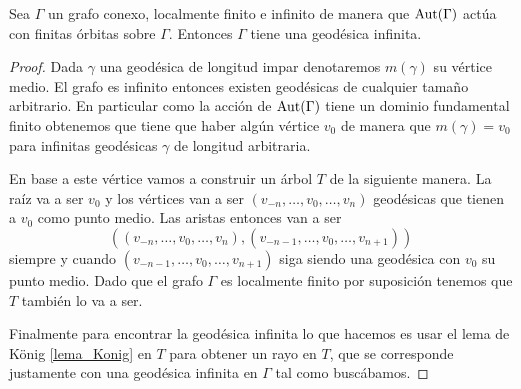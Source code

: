 \documentclass[tesis.tex]{subfiles}
\begin{document}
\begin{lema}\label{lema_geodesica_biinfinita}
	Sea $\Gamma$ un grafo conexo, localmente finito e infinito de manera que $\text{Aut}(\Gamma)$ actúa con finitas órbitas sobre $\Gamma$.
	Entonces $\Gamma$ tiene una geodésica infinita.
\end{lema}
\begin{proof}
	Dada $\gamma$ una geodésica de longitud impar denotaremos $m(\gamma)$ su vértice medio.	
	El grafo es infinito entonces existen geodésicas de cualquier tamaño arbitrario.
	En particular como la acción de $\text{Aut}(\Gamma)$ tiene un dominio fundamental finito obtenemos que tiene que haber algún vértice $v_0$ de manera que $m(\gamma) = v_0$ para infinitas geodésicas $\gamma$ de longitud arbitraria.
	
	En base a este vértice vamos a construir un árbol $T$ de la siguiente manera.
	La raíz va a ser $v_0$ y los vértices van a ser $(v_{-n},\dots, v_0,\dots,v_n)$ geodésicas que tienen a $v_0$ como punto medio.
	Las aristas entonces van a ser 
	\[
		((v_{-n},\dots, v_0,\dots,v_n), (v_{-n-1},\dots, v_0,\dots,v_{n+1}))
	\]
	siempre y cuando $(v_{-n-1},\dots, v_0,\dots,v_{n+1})$ siga siendo una geodésica con $v_0$ su punto medio.
	Dado que el grafo $\Gamma$ es localmente finito por suposición tenemos que $T$ también lo va a ser.
	
	Finalmente para encontrar la geodésica infinita lo que hacemos es usar el lema de König \ref{lema_Konig} en $T$ para obtener un rayo en $T$, que se corresponde justamente con una geodésica infinita en $\Gamma$ tal como buscábamos.
	
\end{proof}
\end{document}
